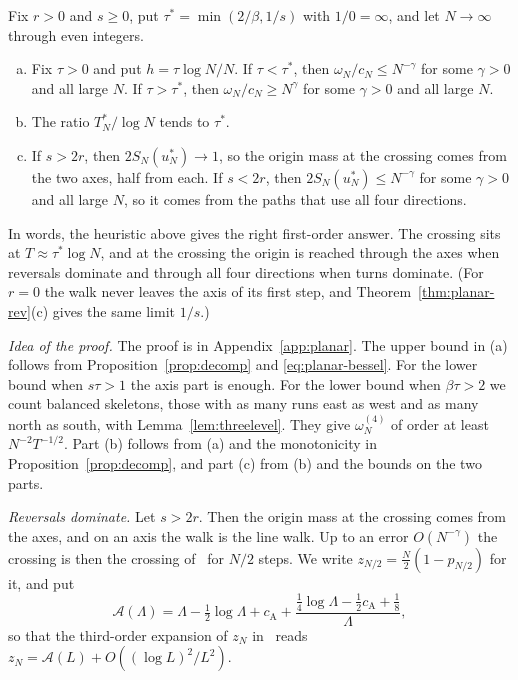 \begin{theorem}\label{thm:planar-first}
Fix $r>0$ and $s\ge0$, put $\tau^*=\min(2/\beta,1/s)$ with $1/0=\infty$, and let $N\to\infty$
through even integers.
\begin{enumerate}[(a)]
\item Fix $\tau>0$ and put $h=\tau\log N/N$. If $\tau<\tau^*$, then $\omega_N/c_N\le N^{-\gamma}$ for
some $\gamma>0$ and all large $N$. If $\tau>\tau^*$, then $\omega_N/c_N\ge N^{\gamma}$ for some
$\gamma>0$ and all large $N$.
\item The ratio $T^*_N/\log N$ tends to $\tau^*$.
\item If $s>2r$, then $2S_N(u^*_N)\to1$, so the origin mass at the crossing comes from the two axes,
half from each. If $s<2r$, then $2S_N(u^*_N)\le N^{-\gamma}$ for some $\gamma>0$ and all large $N$,
so it comes from the paths that use all four directions.
\end{enumerate}
\end{theorem}

In words, the heuristic above gives the right first-order answer. The crossing sits at $T\approx\tau^*\log
N$, and at the crossing the origin is reached through the axes when reversals
dominate and through all four directions when turns dominate. (For $r=0$ the
walk never leaves the axis of its first step, and Theorem~\ref{thm:planar-rev}(c)
gives the same limit $1/s$.)

\emph{Idea of the proof.} The proof is in Appendix~\ref{app:planar}. The upper
bound in (a) follows from Proposition~\ref{prop:decomp} and
\eqref{eq:planar-bessel}. For the lower bound when $s\tau>1$ the axis part is
enough. For the lower bound when $\beta\tau>2$ we count balanced skeletons, those
with as many runs east as west and as many north as south, with
Lemma~\ref{lem:threelevel}. They give $\omega^{(4)}_N$ of order at least
$N^{-2}T^{-1/2}$. Part (b) follows from (a) and the monotonicity in
Proposition~\ref{prop:decomp}, and part (c) from (b) and the bounds on the two
parts.

\emph{Reversals dominate.} Let $s>2r$. Then the origin mass at the crossing
comes from the axes, and on an axis the walk is the line walk. Up to an error
$O(N^{-\gamma})$ the crossing
is then the crossing of~\cite{paperA} for $N/2$ steps. We write
$z_{N/2}=\frac N2(1-p_{N/2})$ for it, and put
\[
 \mathcal A(\Lambda)=\Lambda-\tfrac12\log\Lambda+c_{\mathrm A}
 +\frac{\frac14\log\Lambda-\frac12c_{\mathrm A}+\frac18}{\Lambda},
\]
so that the third-order expansion of $z_N$ in~\cite[Corollary~3.7(c)]{paperA} reads
$z_N=\mathcal A(L)+O((\log L)^2/L^2)$.

